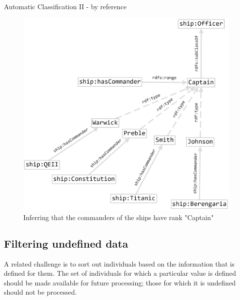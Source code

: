 \begin{challenge}{Automatic Classification II - by reference }
\begin{figure}
\centering
\includegraphics[width=5in]{SWWOv3/media/ch8/figure8-4.png}
\caption{Inferring that the commanders of the ships have rank "Captain"}
\label{fig:ch8.4}
\end{figure}


\end{challenge}

\subsection{Filtering undefined data}

A related challenge is to sort out individuals based on the information
that is defined for them. The set of individuals for which a particular
value is defined should be made available for future processing; those
for which it is undefined should not be processed.


